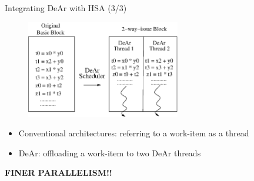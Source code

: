 \documentclass{beamer}
\begin{document}
\begin{CJK}{UTF8}{bkai}
            \begin{frame}{Integrating DeAr with HSA (3/3)}
                        \begin{figure}[!ht]
                            \centering
                                \includegraphics[width=0.6\textwidth]{figs/bb2.eps}
                        \end{figure}
                        \begin{itemize}
                            \item <2-> {Conventional architectures: referring to a work-item as a thread}
                            \item <3-> {DeAr: offloading a work-item to two DeAr threads}
                        \end{itemize}
                        \begin{center}
                            \large{\textbf{FINER PARALLELISM!!}}
                        \end{center}
            \end{frame}


\end{CJK}
\end{document}
